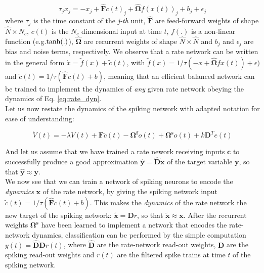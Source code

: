 \documentclass[twoside,11pt,titlepage]{article}
\begin{document}
\begin{equation} \label{eq:rate_dyn}
  \tau_j \dot{x}_j = -x_j + \hat{\mathbf{F}}c(t)_j + \hat{\mathbf{\Omega}}f(x(t))_j + b_j + \epsilon_j
\end{equation}
where $\tau_j$ is the time constant of the \textit{j-th} unit, $\hat{\mathbf{F}}$ are feed-forward weights of shape $\hat{N} \times N_c$, $c(t)$ is the $N_c$ dimensional input at time $t$,
$f(.)$ is a non-linear function (e.g.$\textnormal{tanh}(.)$), $\hat{\mathbf{\Omega}}$ are recurrent weights of shape $\hat{N} \times \hat{N}$ and $b_j$ and $\epsilon_j$ are bias and noise terms, respectively.
We observe that a rate network can be written in the general form $\dot{x} = \tilde{f}(x) + \tilde{c}(t)$, with $\tilde{f}(x) = 1/\tau(-x + \hat{\mathbf{\Omega}}fx(t))+ \epsilon)$
and $\tilde{c}(t)=1/\tau(\hat{\mathbf{F}}c(t) + b)$, meaning that an efficient balanced network can be trained to implement the dynamics of \textit{any} given rate network obeying the
dynamics of Eq. \ref{eq:rate_dyn}. \\
Let us now restate the dynamics of the spiking network with adapted notation for ease of understanding:

\begin{equation*}
  \dot{V}(t) = -\lambda V(t) + \mathbf{F}\tilde{c}(t) - \mathbf{\Omega^f}o(t) + \mathbf{\Omega^s}o(t) + k\mathbf{D}^Te(t)
\end{equation*}

And let us assume that we have trained a rate nework receiving inputs $\mathbf{c}$ to successfully produce a good approximation $\hat{\mathbf{y}} = \hat{\mathbf{D}}\mathbf{x}$ of the target
variable $\mathbf{y}$, so that $\hat{\mathbf{y}} \approx \mathbf{y}$. \\
We now see that we can train a network of spiking neurons to encode the \textit{dynamics} $\mathbf{x}$ of the rate network, by giving the spiking network
input $\tilde{c}(t)=1/\tau(\hat{\mathbf{F}}c(t) + b)$. This makes the \textit{dynamics} of the rate network the new target of the spiking network: $\tilde{\mathbf{x}}=\mathbf{D}r$,
so that $\tilde{\mathbf{x}} \approx \mathbf{x}$. After the recurrent weights $\mathbf{\Omega^s}$ have been learned to implement a network that encodes the rate-network dynamics, classification
can be performed by the simple computation $y(t) = \hat{\mathbf{D}}\mathbf{D}r(t)$, where $\hat{\mathbf{D}}$ are the rate-network read-out weights, $\mathbf{D}$ are the spiking read-out weights
and $r(t)$ are the filtered spike trains at time $t$ of the spiking network. \\
\end{document}
